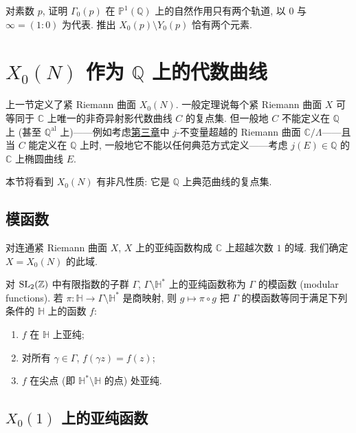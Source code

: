 \begin{exercise} \label{thm:5.1.10}
对素数 $p$, 证明 $\Gamma_0(p)$ 在 $\mathbb{P}^1(\mathbb{Q})$ 上的自然作用只有两个轨道, 以 $0$ 与 $\infty = (1:0)$ 为代表. 推出 $X_0(p)\setminus Y_0(p)$ 恰有两个元素.
\end{exercise}


\section{\texorpdfstring{$X_0(N)$ 作为 $\mathbb{Q}$ 上的代数曲线}{X0(N) 作为 Q 上的代数曲线}}\label{sec:5.2}

上一节定义了紧 Riemann 曲面 $X_0(N)$. 一般定理说每个紧 Riemann 曲面 $X$ 可等同于 $\mathbb{C}$ 上唯一的非奇异射影代数曲线 $C$ 的复点集. 但一般地 $C$ 不能定义在 $\mathbb{Q}$ 上 (甚至 $\mathbb{Q}^{\mathrm{al}}$ 上)——例如考虑\hyperref[ch:3]{第三章}中 $j$-不变量超越的 Riemann 曲面 $\mathbb{C}/\Lambda$——且当 $C$ 能定义在 $\mathbb{Q}$ 上时, 一般地它不能以任何典范方式定义——考虑 $j(E)\in\mathbb{Q}$ 的 $\mathbb{C}$ 上椭圆曲线 $E$.

本节将看到 $X_0(N)$ 有非凡性质: 它是 $\mathbb{Q}$ 上典范曲线的复点集.

\subsection*{模函数}

对连通紧 Riemann 曲面 $X$, $X$ 上的亚纯函数构成 $\mathbb{C}$ 上超越次数 $1$ 的域. 我们确定 $X = X_0(N)$ 的此域.

对 $\operatorname{SL}_2(\mathbb{Z})$ 中有限指数的子群 $\Gamma$, $\Gamma\setminus\mathbb{H}^*$ 上的亚纯函数称为 $\Gamma$ 的模函数 (modular functions). 若 $\pi\colon\mathbb{H}\to\Gamma\setminus\mathbb{H}^*$ 是商映射, 则 $g\mapsto\pi\circ g$ 把 $\Gamma$ 的模函数等同于满足下列条件的 $\mathbb{H}$ 上的函数 $f$:
\begin{enumerate}[label=\textup{(\alph*)}]
\item $f$ 在 $\mathbb{H}$ 上亚纯;
\item 对所有 $\gamma\in\Gamma$, $f(\gamma z) = f(z)$;
\item $f$ 在尖点 (即 $\mathbb{H}^*\setminus\mathbb{H}$ 的点) 处亚纯.
\end{enumerate}

\subsection*{$X_0(1)$ 上的亚纯函数}

